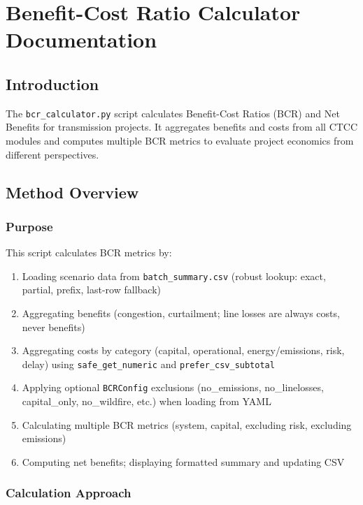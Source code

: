 \documentclass[ctcc_full_documentation.tex]{subfiles}
\begin{document}
\chapter{Benefit-Cost Ratio Calculator Documentation}

\section{Introduction}

The \texttt{bcr\_calculator.py} script calculates Benefit-Cost Ratios (BCR) and Net Benefits for transmission projects. It aggregates benefits and costs from all CTCC modules and computes multiple BCR metrics to evaluate project economics from different perspectives.

\section{Method Overview}

\subsection{Purpose}

This script calculates BCR metrics by:
\begin{enumerate}
    \item Loading scenario data from \texttt{batch\_summary.csv} (robust lookup: exact, partial, prefix, last-row fallback)
    \item Aggregating benefits (congestion, curtailment; line losses are always costs, never benefits)
    \item Aggregating costs by category (capital, operational, energy/emissions, risk, delay) using \texttt{safe\_get\_numeric} and \texttt{prefer\_csv\_subtotal}
    \item Applying optional \texttt{BCRConfig} exclusions (no\_emissions, no\_linelosses, capital\_only, no\_wildfire, etc.) when loading from YAML
    \item Calculating multiple BCR metrics (system, capital, excluding risk, excluding emissions)
    \item Computing net benefits; displaying formatted summary and updating CSV
\end{enumerate}

\subsection{Calculation Approach}
\end{document}
